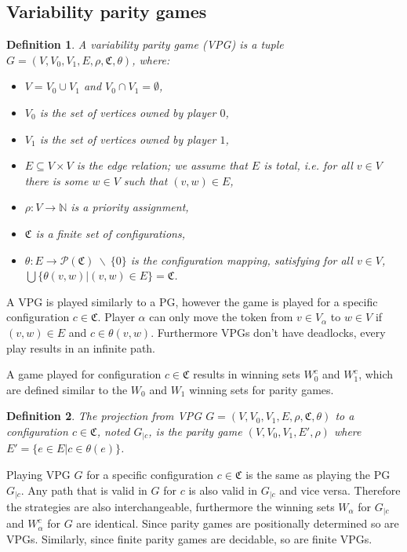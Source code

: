 \documentclass[]{article}
\newtheorem{definition}{Definition}[section]
\begin{document}
\subsection{Variability parity games}
\begin{definition}
	\label{def_VPG}
	A variability parity game (VPG) is a tuple $G = (V,V_0, V_1, E, \rho, \mathfrak{C}, \theta)$, where:
	\begin{itemize}
		\item $V = V_0 \cup V_1$ and $V_0 \cap V_1 = \emptyset$,
		\item $V_0$ is the set of vertices owned by player $0$,
		\item $V_1$ is the set of vertices owned by player $1$, 
		\item $E \subseteq V \times V$ is the edge relation; we assume that $E$ is total, i.e. for all $v\in V$ there is some $w \in V$ such that $(v,w) \in E$,
		\item $\rho :  V \rightarrow \mathbb{N}$ is a priority assignment,
		\item $\mathfrak{C}$ is a finite set of configurations,
		\item $\theta : E \rightarrow \mathcal{P}(\mathfrak{C})\ \backslash\ \{0\}$ is the configuration mapping, satisfying for all $v \in V$, $\bigcup\{\theta(v,w)|(v,w) \in E\} = \mathfrak{C}$.
	\end{itemize}
\end{definition}
A VPG is played similarly to a PG, however the game is played for a specific configuration $c \in \mathfrak{C}$. Player $\alpha$ can only move the token from $v \in V_\alpha$ to $w \in V$ if $(v,w) \in E$ and $c \in \theta(v,w)$. Furthermore VPGs don't have deadlocks, every play results in an infinite path.

A game played for configuration $c \in \mathfrak{C}$ results in winning sets $W_0^c$ and $W_1^c$, which are defined similar to the $W_0$ and $W_1$ winning sets for parity games.

\begin{definition}
	\label{def_VPG_proj} The projection from VPG $G = (V, V_0, V_1, E, \rho, \mathfrak{C}, \theta)$ to a configuration $c \in \mathfrak{C}$, noted $G_{|c}$, is the parity game $(V, V_0, V_1, E', \rho)$ where $E' = \{ e\in E | c \in \theta(e)\}$.
\end{definition}

Playing VPG $G$ for a specific configuration $c \in \mathfrak{C}$ is the same as playing the PG $G_{|c}$. Any path that is valid in $G$ for $c$ is also valid in $G_{|c}$ and vice versa. Therefore the strategies are also interchangeable, furthermore the winning sets $W_\alpha$ for $G_{|c}$ and $W_\alpha^c$ for $G$ are identical. Since parity games are positionally determined so are VPGs. Similarly, since finite parity games are decidable, so are finite VPGs.
\end{document}
